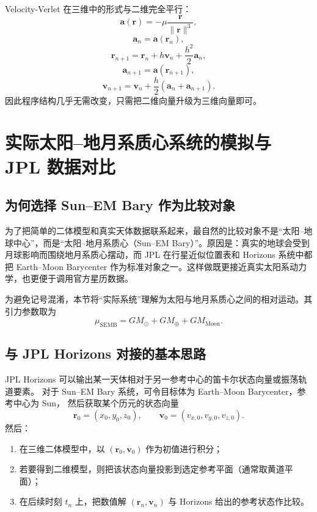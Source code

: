 Velocity-Verlet 在三维中的形式与二维完全平行：
\[
\bm a(\bm r)=-\mu \frac{\bm r}{\|\bm r\|^3},
\]
\[
\bm a_n=\bm a(\bm r_n),
\]
\[
\bm r_{n+1}=\bm r_n+h\bm v_n+\frac{h^2}{2}\bm a_n,
\]
\[
\bm a_{n+1}=\bm a(\bm r_{n+1}),
\]
\[
\bm v_{n+1}=\bm v_n+\frac{h}{2}(\bm a_n+\bm a_{n+1}).
\]
因此程序结构几乎无需改变，只需把二维向量升级为三维向量即可\cite{HairerLubichWanner2006,LeimkuhlerReich2004}。

\section{实际太阳--地月系质心系统的模拟与 JPL 数据对比}

\subsection{为何选择 Sun--EM Bary 作为比较对象}

为了把简单的二体模型和真实天体数据联系起来，最自然的比较对象不是“太阳--地球中心”，而是“太阳--地月系质心（Sun--EM Bary）”。原因是：真实的地球会受到月球影响而围绕地月系质心摆动，而 JPL 在行星近似位置表和 Horizons 系统中都把 Earth--Moon Barycenter 作为标准对象之一。这样做既更接近真实太阳系动力学，也更便于调用官方星历数据。

为避免记号混淆，本节将“实际系统”理解为太阳与地月系质心之间的相对运动\cite{JPLHorizonsManual,JPLApproximatePositions}。其引力参数取为
\[
\mu_{\mathrm{SEMB}}=GM_{\odot}+GM_{\oplus}+GM_{\mathrm{Moon}}.
\]

\subsection{与 JPL Horizons 对接的基本思路}

JPL Horizons 可以输出某一天体相对于另一参考中心的笛卡尔状态向量或振荡轨道要素。
对于 Sun--EM Bary 系统，可令目标体为 Earth--Moon Barycenter，参考中心为 Sun，
然后获取某个历元的状态向量\cite{JPLHorizonsManual,JPLHorizonsAPI}
\[
\bm r_0=(x_0,y_0,z_0),
\qquad
\bm v_0=(v_{x,0},v_{y,0},v_{z,0}).
\]
然后：
\begin{enumerate}[label=\arabic*.]
  \item 在三维二体模型中，以 \((\bm r_0,\bm v_0)\) 作为初值进行积分；
  \item 若要得到二维模型，则把该状态向量投影到选定参考平面（通常取黄道平面）；
  \item 在后续时刻 \(t_n\) 上，把数值解 \((\bm r_n,\bm v_n)\) 与 Horizons 给出的参考状态作比较。
\end{enumerate}

